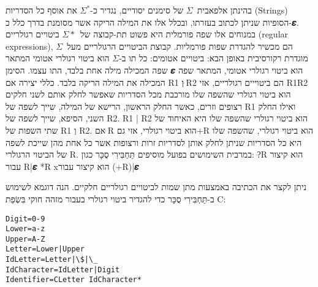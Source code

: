 בהינתן אלפאבית~$Σ$ של סימנים יסודיים, נגדיר כ-$Σ^*$ את אוסף כל הסדריות
(Strings) הסופיות שניתן לכתוב בעזרתו, ובכלל אלו את המילה הריקה אשר מסומנת בדרך
כלל כ-𝜺. במנוחים אלו שפה פורמלית היא פשוט תת-קבוצה של~$Σ*$ ביטויים רגולריים
(regular expressions), הם מכשיר להגדרת שפות פורמליות. קבוצת הביטויים הרגולריים
מעל~$Σ$ מוגדרת רקורסיבית באופן הבא:
ביטויים אטומים:
כל תו ב-$Σ$ הוא ביטוי רגולרי אטומי המתאר שפה המכילה מילה אחת בלבד, התו עצמו.
הסימן 𝜺 הוא ביטוי רגולרי אטומי, המתאר שפה המכילה את המילה הריקה בלבד.
כללי יצירה
אם R1 וְ ּR2 הם ביטוייים רגולריים, אזי
R1R2 הוא ביטוי רגולרי שהשפה שלו מורכבת מכל הסדריות שאפשר לחלק אותם לשני חלקים רצופים וזרים, כאשר החלק הראשון, הרישא של המילה, שייך לשפה של R1 ואילו החלק השני, הסיפא, שייך לשפה של R2.
R1 | R2 הוא ביטוי רגולרי שהשפה שלו היא האיחוד של שתי השפות של R1 וְ R2.
אם ּR הוא ביטוי רגולרי, אזי גם+R הוא ביטוי רגולרי, שהשפה שלו היא כל הסדריות שניתן לחלק אותן לסדריות זרות ורצופות אשר כל אחת מהן שייכת לשפה של הביטוי הרגולרי R.
במרבית השימושים בפועל מוסיפים תַּחְבִּירִי סֻכָּר כגון:
?ּR הוא קיצור עבור R|𝜺
*R xהוא קיצור עבור (+R)|𝜺

ניתן לקצר את הכתיבה באמצעות מתן שמות לביטויים רגולריים חלקיים.
הנה דוגמא לשימוש ב-תַּחְבִּירִי סֻכָּר כדי להגדיר ביטוי רגולרי בעבור מזהה חוקי בִּשְׂפַת C:
\begin{verbatim}
Digit=0-9
Lower=a-z
Upper=A-Z
Letter=Lower|Upper
IdLetter=Letter|\$|\_
IdCharacter=IdLetter|Digit
Identifier=CLetter IdCharacter*
\end{verbatim}

